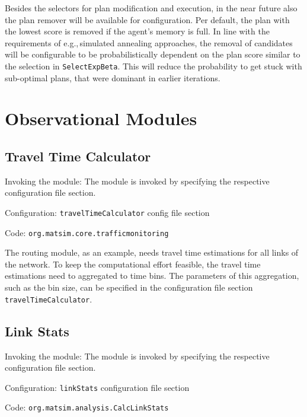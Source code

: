 Besides the selectors for plan modification and execution, in the near future also the plan remover will be available for configuration. Per default, the plan with the lowest score is removed if the agent's memory is full. In line with the requirements of e.g.,\,simulated annealing approaches, the removal of candidates will be configurable to be probabilistically dependent on the plan score similar to the selection in \lstinline|SelectExpBeta|. This will reduce the probability to get stuck with sub-optimal plans, that were dominant in earlier iterations.

\section{Observational Modules}
\label{sec:observational}

\subsection{Travel Time Calculator}
\label{sec:ttc}
\begin{compactitem}
\item Invoking the module: The module is invoked by specifying the respective configuration file section.
\item Configuration: \lstinline|travelTimeCalculator| config file section
\item Code: \lstinline|org.matsim.core.trafficmonitoring|
\end{compactitem}

The routing module, as an example, needs travel time estimations for all links of the network. To keep the computational effort feasible, the travel time estimations need to aggregated to time bins. The parameters of this aggregation, such as the bin size, can be specified in the configuration file section \lstinline|travelTimeCalculator|.

\subsection{Link Stats}
\label{sec:linkStats}
\begin{compactitem}
\item Invoking the module: The module is invoked by specifying the respective configuration file section.
\item Configuration: \lstinline|linkStats| configuration file section
\item Code: \lstinline|org.matsim.analysis.CalcLinkStats|
\end{compactitem}

